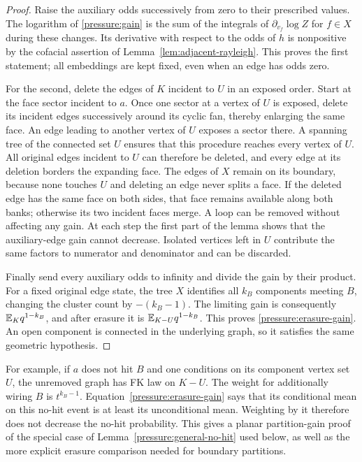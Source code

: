 \begin{proof}
Raise the auxiliary odds successively from zero to their prescribed
values. The logarithm of \eqref{pressure:gain} is the sum of the
integrals of $\partial_{v_f}\log Z$ for $f\in X$ during these changes.
Its derivative with respect to the odds of $h$ is nonpositive by the
cofacial assertion of Lemma~\ref{lem:adjacent-rayleigh}. This proves
the first statement; all embeddings are kept fixed, even when an
edge has odds zero.

For the second, delete the edges of $K$ incident to $U$ in an exposed
order. Start at the face sector incident to $a$. Once one sector at
a vertex of $U$ is exposed, delete its incident edges successively
around its cyclic fan, thereby enlarging the same face. An edge
leading to another vertex of $U$ exposes a sector there. A spanning
tree of the connected set $U$ ensures that this procedure reaches
every vertex of $U$. All original edges incident to $U$ can therefore
be deleted, and every edge at its deletion borders the expanding
face. The edges of $X$ remain on its boundary, because none touches
$U$ and deleting an edge never splits a face. If the deleted edge
has the same face on both sides, that face remains available along
both banks; otherwise its two incident faces merge. A loop can be removed
without affecting any gain. At each step the first part of the
lemma shows that the auxiliary-edge gain cannot decrease. Isolated
vertices left in $U$ contribute the same factors to numerator and
denominator and can be discarded.

Finally send every auxiliary odds to infinity and divide the gain
by their product. For a fixed original edge state, the tree $X$
identifies all $k_B$ components meeting $B$, changing the cluster
count by $-(k_B-1)$. The limiting gain is consequently
$\mathbb E_K q^{1-k_B}$, and after erasure it is
$\mathbb E_{K-U}q^{1-k_B}$. This proves
\eqref{pressure:erasure-gain}. An open component is connected in the
underlying graph, so it satisfies the same geometric hypothesis.
\end{proof}

For example, if $a$ does not hit $B$ and one conditions on its
component vertex set $U$, the unremoved graph has FK law on $K-U$.
The weight for additionally wiring $B$ is $t^{k_B-1}$.
Equation~\eqref{pressure:erasure-gain} says that its conditional mean
on this no-hit event is at least its unconditional mean. Weighting
by it therefore does not decrease the no-hit probability. This gives a
planar partition-gain proof of the special case of
Lemma~\ref{pressure:general-no-hit} used below, as well as the more
explicit erasure comparison needed for boundary partitions.

